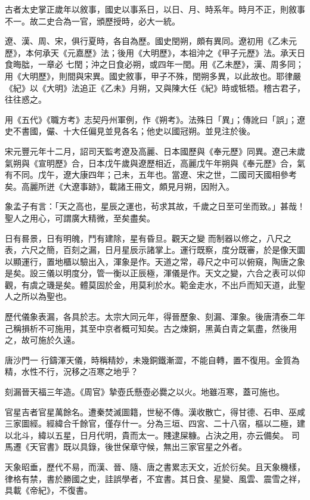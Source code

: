 
\begin{pinyinscope}

 古者太史掌正歲年以敘事，國史以事系日，以日、月、時系年。時月不正，則敘事不一。故二史合為一官，頒歷授時，必大一統。



 遼、漢、周、宋，俱行夏時，各自為歷。國史閏朔，頗有異同。遼初用《乙未元歷》，本何承天《元嘉歷》法；後用《大明歷》，本祖沖之《甲子元歷》法。承天日食晦朏，一章必
 七閏；沖之日食必朔，或四年一閏。用《乙未歷》，漢、周多同；用《大明歷》，則間與宋異。國史敘事，甲子不殊，閏朔多異，以此故也。耶律嚴《紀》以《大明》法追正《乙未》月朔，又與陳大任《紀》時或牴牾。稽古君子，往往惑之。



 用《五代》《職方考》志契丹州軍例，作《朔考》。法殊日「異」；傳訛曰「誤」；遼史不書國，儼、十大任偏見並見各名；他史以國冠朔。並見注於後。



 宋元豐元年十二月，詔司天監考遼及高麗、日本國歷與《奉元歷》同異。遼己未歲氣朔與《宣明歷》合，日本戊午歲與遼歷相近，高麗戊午年朔與《奉元歷》合，氣有不同。戊午，遼大康四年；己未，五年也。當遼、宋之世，二國司天國相參考矣。高麗所迸《大遼事跡》，載諸王冊文，頗見月朔，因附入。



 象孟子有言：「天之高也，星辰之運也，茍求其故，千歲之日至可坐而致。」甚哉！聖人之用心，可謂廣大精微，至矣盡矣。



 日有晷景，日有明魄，鬥有建除，星有昏旦。觀天之變
 而制器以修之，八尺之表，六尺之簡，百刻之漏，日月星辰示諸掌上。運行既察，度分既審，於是像天圜以顯運行，置地櫃以驗出入，渾象是作。天道之常，尋尺之中可以俯窺，陶唐之象是矣。設三儀以明度分，管一衡以正辰極，渾儀是作。天文之變，六合之表可以仰觀，有虞之璣是矣。體莫固於金，用莫利於水。範金走水，不出戶而知天道，此聖人之所以為聖也。



 歷代儀象表漏，各具於志。太宗大同元年，得晉歷象、刻漏、渾象。後唐清泰二年己稱損析不可施用，其至中京者概可知矣。古之煉銅，黑黃白青之氣盡，然後用之，故可施於久遠。



 唐沙門一
 行鑄渾天儀，時稱精妙，未幾銅鐵漸澀，不能自轉，置不復用。金質為精，水性不行，況移之冱寒之地乎？



 刻漏晉天福三年造。《周官》摯壺氏懸壺必爨之以火。地雖冱寒，蓋可施也。



 官星吉者官星萬餘名。遭秦焚滅圖籍，世秘不傳。漢收散亡，得甘德、石申、巫咸三家圖經。經緯合千餘官，僅存什一。分為三垣、四宮、二十八宿，樞以二極，建以北斗，緯以五星，日月代明，貴而太一。賤逮屎糠。占決之用，亦云備矣。
 司馬遷《天官書》既以具錄，後世保章守候，無出三家官星之外者。



 天象昭垂，歷代不易，而漢、晉、隨、唐之書累志天文，近於衍矣。且天象機樣，律格有禁，書於勝國之史，詿誤學者，不宜書。其日食、星變、風雲、震雪之祥，具載《帝紀》，不復書。



\end{pinyinscope}